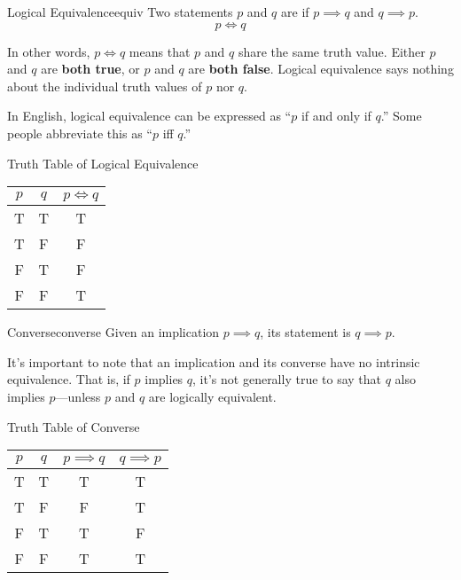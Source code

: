 \begin{dfnbox}{Logical Equivalence}{equiv}
    Two statements $p$ and $q$ are  if $p \implies q$ and $q \implies p$.
    \tcblower
    \[ p \iff q \]
\end{dfnbox}

In other words, $p \iff q$ means that $p$ and $q$ share the same truth value. Either $p$ and $q$ are \textbf{both true}, or $p$ and $q$ are \textbf{both false}. Logical equivalence says nothing about the individual truth values of $p$ nor $q$.

In English, logical equivalence can be expressed as ``$p$ if and only if $q$.'' Some people abbreviate this as ``$p$ iff $q$.''

\begin{exbox}{Truth Table of Logical Equivalence}{}
    \begin{center}\begin{tabular}{c | c || c}
        $p$ & $q$ & $p \iff q$ \\ \hline
        T & T & T \\
        T & F & F \\
        F & T & F \\
        F & F & T
    \end{tabular}\end{center}
\end{exbox}

\begin{dfnbox}{Converse}{converse}
    Given an implication $p \implies q$, its  statement is $q \implies p$.
\end{dfnbox}

It's important to note that an implication and its converse have no intrinsic equivalence. That is, if $p$ implies $q$, it's not generally true to say that $q$ also implies $p$---unless $p$ and $q$ are logically equivalent.


\begin{exbox}{Truth Table of Converse}{}
    \begin{center}\begin{tabular}{c | c || c | c}
        $p$ & $q$ & $p \implies q$ & $q \implies p$ \\ \hline
        T & T & T & T \\
        T & F & F & T \\
        F & T & T & F \\
        F & F & T & T
    \end{tabular}\end{center}
\end{exbox}

